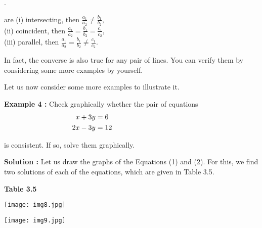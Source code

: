 \documentclass{article}
\begin{document}
\pagestyle{empty} %
\thispagestyle{fancy} %
\renewcommand{\headrulewidth}{0pt} %
.
\vspace{1em}

are (i) intersecting, then $\frac{a_1}{a_2} \ne \frac{b_1}{b_2},$  
\\

\hspace{1.7em}(ii) coincident, then   $\frac{a_1}{a_2} = \frac{b_1}{b_2} = \frac{c_1}{c_2},$
\\

\hspace{1.7em}(iii) parallel, then $\frac{a_1}{a_2} = \frac{b_1}{b_2} \ne \frac{c_1}{c_2}.$
\vspace{1em}
\\
\par In fact, the converse is also true for any pair of lines. You can verify them by considering some more examples by yourself.

Let us now consider some more examples to illustrate it.

\noindent
\textbf{\textcolor{ncertcyan}{Example 4 :}} Check graphically whether the pair of equations
\begin{align}
x + 3y &= 6 \hspace{4cm}  \\
2x - 3y &= 12 \hspace{3.9cm}
\end{align}

\noindent
is consistent. If so, solve them graphically.

\noindent
\textbf{\textcolor{ncertcyan}{Solution :}} Let us draw the graphs of the Equations (1) and (2). For this, we find two solutions of each of the equations, which are given in Table 3.5.

\begin{center}
\textbf{\textcolor{ncertcyan}{Table 3.5}}
\end{center}
\begin{minipage}{0.45\textwidth}
    \texttt{[image: img8.jpg]}
\end{minipage}
\hspace{0.05\textwidth}
\begin{minipage}{0.45\textwidth}
    \texttt{[image: img9.jpg]} 
\end{minipage}
\end{document}
